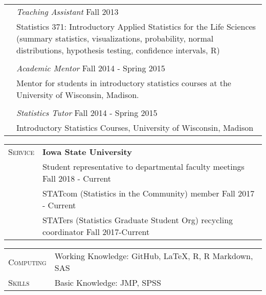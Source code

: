 \documentclass[11pt, oneside]{article}
\begin{document}
\begin{longtable}{p{3cm}p{14cm}}
\\
& \emph{Teaching Assistant} \hfill{Fall 2013}\\
& Statistics 371: Introductory Applied Statistics for the Life Sciences (summary statistics, visualizations, probability, normal distributions, hypothesis testing, confidence intervals, R)\\
\\
& \emph{Academic Mentor} \hfill{Fall 2014 - Spring 2015}\\
& Mentor for students in introductory statistics courses at the University of Wisconsin, Madison.\\
\\
& \emph{Statistics Tutor} \hfill{Fall 2014 - Spring 2015}\\
& Introductory Statistics Courses, University of Wisconsin, Madison
\end{longtable}

\vspace{0.5cm}

\noindent 
\begin{tabular}{p{3cm}p{14cm}}
\textsc{Service} & \textbf{Iowa State University} \\
& Student representative to departmental faculty meetings \hfill{Fall 2018 - Current}\\
& STATcom (Statistics in the Community) member \hfill{Fall 2017 - Current}\\
& STATers (Statistics Graduate Student Org) recycling coordinator \hfill{Fall 2017-Current}
\end{tabular}


\vspace{0.5cm}

\noindent
\begin{tabular}{p{3cm}l}
\textsc{Computing} & Working Knowledge: GitHub, LaTeX, R, R Markdown, SAS\\
\textsc{Skills} & Basic Knowledge: JMP, SPSS
\end{tabular}
\end{document}
